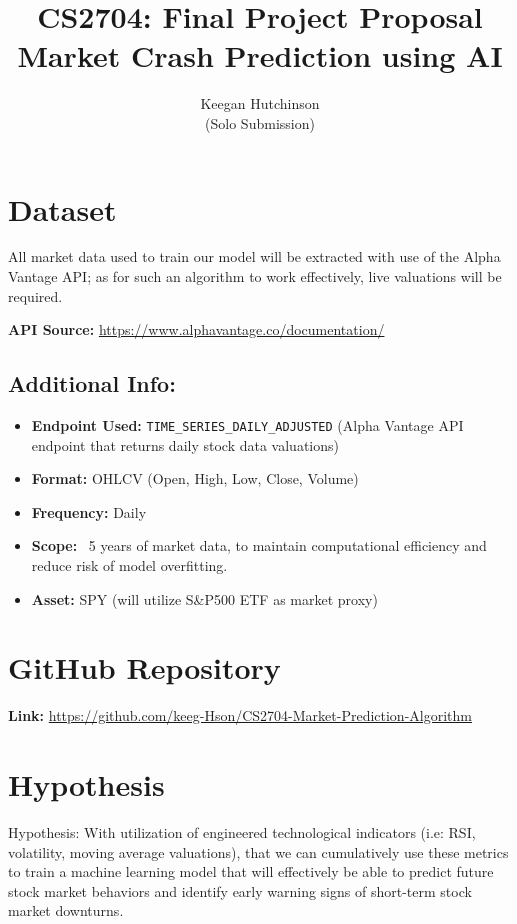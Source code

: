 \documentclass[runningheads]{llncs}
\title{CS2704: Final Project Proposal \\ Market Crash Prediction using AI}
\author{Keegan Hutchinson \\(Solo Submission)}
\institute{University of New Brunswick Saint John}
\begin{document}
\maketitle

\section*{Dataset}

All market data used to train our model will be extracted with use of the Alpha Vantage API; as for such an algorithm to work effectively, live valuations will be required. 

\vspace{1.0em}

\textbf{API Source:} \url{https://www.alphavantage.co/documentation/}


\subsection*{Additional Info:}
\begin{itemize}
  \item \textbf {Endpoint Used:} \texttt{TIME\_SERIES\_DAILY\_ADJUSTED} (Alpha Vantage API endpoint that returns daily stock data valuations)
  \item \textbf {Format:} OHLCV (Open, High, Low, Close, Volume)
  \item  \textbf {Frequency:} Daily
  \item  \textbf {Scope:} ~5 years of market data, to maintain computational efficiency and reduce risk of model overfitting.
  \item  \textbf {Asset:} SPY (will utilize S\&P500 ETF as market proxy)
\end{itemize}

\section*{GitHub Repository}
\textbf{Link:} \url{https://github.com/keeg-Hson/CS2704-Market-Prediction-Algorithm}

\section*{Hypothesis}
Hypothesis: With utilization of engineered technological indicators (i.e: RSI, volatility, moving average valuations), that we can cumulatively use these metrics to train a machine learning model that will effectively be able to predict future stock market behaviors and identify early warning signs of short-term stock market downturns.
\end{document}
